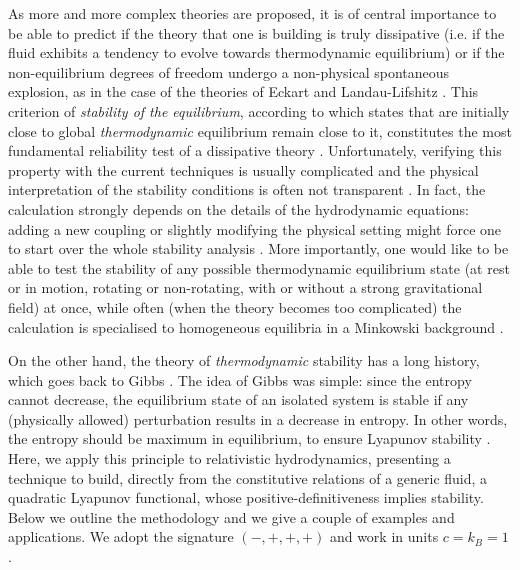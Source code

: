 \documentclass[a4paper, amsfonts, amssymb, amsmath, reprint, showkeys, nofootinbib, twoside, onecolumn,notitlepage]{revtex4-1}
\begin{document}
As more and more complex theories are proposed, it is of central importance to be able to predict if the theory that one is building is truly dissipative (i.e. if the fluid exhibits a tendency to evolve towards thermodynamic equilibrium) or if the non-equilibrium degrees of freedom undergo a non-physical spontaneous explosion, as in the case of the theories of Eckart and Landau-Lifshitz \cite{Hiscock_Insatibility_first_order,Hishcock1988}. This criterion of \textit{stability of the equilibrium}, according to which states that are initially close to global \textit{thermodynamic} equilibrium  \cite{VANWEERT1982,Israel_2009_inbook,BecattiniBeta2016,Salazar2020,GavassinoTermometri} remain close to it, constitutes the most fundamental reliability test of a dissipative theory \cite{GavassinoFronntiers2021}. Unfortunately, verifying this property with the current techniques is usually complicated and the physical interpretation of the stability conditions is often not transparent \cite{Geroch95,LindblomRelaxation1996,Kost2000,Straughan2004}. In fact, the calculation strongly depends on the details of the hydrodynamic equations: adding a new coupling or slightly modifying the physical setting might force one to start over the whole stability analysis \cite{OlsonLifsh1990,Straughan2004,Brito2020}. More importantly, one would like to be able to test the stability of any possible thermodynamic equilibrium state (at rest or in motion, rotating or non-rotating, with or without a strong gravitational field) at once, while often (when the theory becomes too complicated) the calculation is specialised to homogeneous equilibria in a Minkowski background \cite{VanBir2008,Stricker2019,Brito2020,Kovtun2019,BemficaDNDefinitivo2020,Lopez11}.


On the other hand, the theory of \textit{thermodynamic} stability has a long history, which goes back to Gibbs \cite{PrigoginebookModernThermodynamics2014}. The idea of Gibbs was simple: since the entropy cannot decrease, the equilibrium state of an isolated system is stable if any (physically allowed) perturbation results in a decrease in entropy. In other words, the entropy should be maximum in equilibrium, to ensure Lyapunov stability \cite{Prigogine1978}. Here, we apply this principle to relativistic hydrodynamics, presenting a technique to build, directly from the constitutive relations of a generic fluid, a quadratic Lyapunov functional, whose positive-definitiveness implies stability. Below we outline the methodology and we give a couple of examples and applications. We adopt the signature $(-,+,+,+)$ and work in units $c=k_B=1$.
\end{document}
